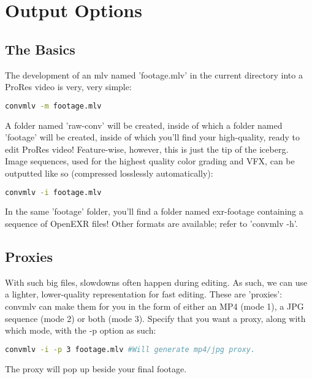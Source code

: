 \documentclass[a4paper,12pt]{article}
\begin{document}
\section{Output Options}
	
	\subsection{The Basics}
		
		The development of an mlv named 'footage.mlv' in the current directory into a ProRes video is very, very simple:
		
\begin{lstlisting}[language=bash]
	convmlv -m footage.mlv
\end{lstlisting}
		
		A folder named 'raw-conv' will be created, inside of which a folder named 'footage' will be created, inside of which you'll find your
		high-quality, ready to edit ProRes video! Feature-wise, however, this is just the tip of the iceberg.\\
		
		Image sequences, used for the highest quality color grading and VFX, can be outputted like so (compressed losslessly automatically):
		
\begin{lstlisting}[language=bash]
	convmlv -i footage.mlv
\end{lstlisting}
		
		In the same 'footage' folder, you'll find a folder named exr-footage containing a sequence of OpenEXR files! Other formats
		are available; refer to 'convmlv -h'.
		
	\subsection{Proxies}

		With such big files, slowdowns often happen during editing. As such, we can use a lighter, lower-quality representation for fast editing.
		These are 'proxies': convmlv can make them for you in the form of either an MP4 (mode 1), a JPG sequence (mode 2) or both (mode 3). Specify
		that you want a proxy, along with which mode, with the -p option as such:
	
\begin{lstlisting}[language=bash]
	convmlv -i -p 3 footage.mlv #Will generate mp4/jpg proxy.
\end{lstlisting}

		The proxy will pop up beside your final footage.\\
		
\end{document}
